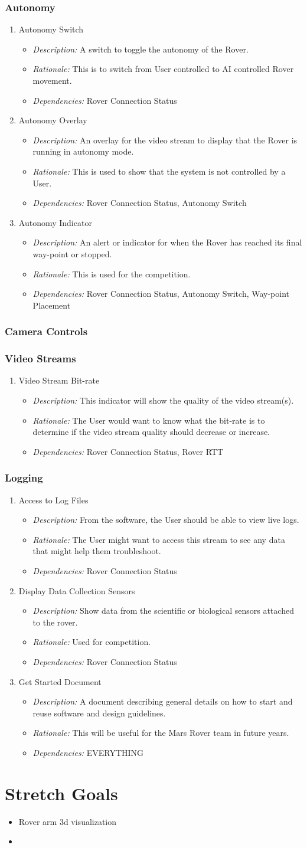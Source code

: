 \documentclass[onecolumn, draftclsnofoot, 10pt, compsoc]{IEEEtran}
\newcommand{\functRequ}[4]{
\item #1%
\par
\begin{itemize}
\item \textit{Description:} #2.%
\item \textit{Rationale:} #3.%
\item \textit{Dependencies:} #4%
\end{itemize}
}
\begin{document}
\subsubsection{Autonomy}
\begin{enumerate}
\functRequ{Autonomy Switch}
{A switch to toggle the autonomy of the Rover}
{This is to switch from User controlled to AI controlled Rover movement}
{Rover Connection Status}

\functRequ{Autonomy Overlay}
{An overlay for the video stream to display that the Rover is running in autonomy mode}
{This is used to show that the system is not controlled by a User}
{Rover Connection Status, Autonomy Switch}

\functRequ{Autonomy Indicator}
{An alert or indicator for when the Rover has reached its final way-point or stopped}
{This is used for the competition}
{Rover Connection Status, Autonomy Switch, Way-point Placement}
\end{enumerate}
\subsubsection{Camera Controls}


\subsubsection{Video Streams}
\begin{enumerate}

\functRequ{Video Stream Bit-rate}
{This indicator will show the quality of the video stream(s)}
{The User would want to know what the bit-rate is to determine if the video stream quality should decrease or increase}
{Rover Connection Status, Rover RTT}

\end{enumerate}
\subsubsection{Logging}
\begin{enumerate}

\functRequ{Access to Log Files}
{From the software, the User should be able to view live logs}
{The User might want to access this stream to see any data that might help them troubleshoot}
{Rover Connection Status}

\functRequ{Display Data Collection Sensors}
{Show data from the scientific or biological sensors attached to the rover}
{Used for competition}
{Rover Connection Status}

\functRequ{Get Started Document}
{A document describing general details on how to start and reuse software and design guidelines}
{This will be useful for the Mars Rover team in future years}
{EVERYTHING}
\end{enumerate}

\section{Stretch Goals}
\begin{itemize}
\item Rover arm 3d visualization
\item 
\end{itemize}
\end{document}
